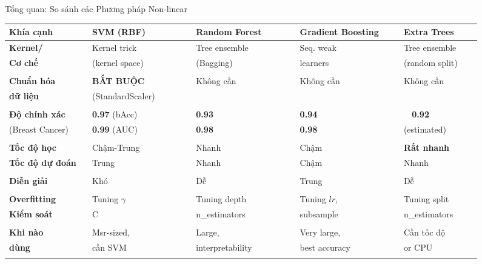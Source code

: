 \begin{frame}{Tổng quan: So sánh các Phương pháp Non-linear}
    \footnotesize
    \renewcommand{\arraystretch}{1.3}
    \begin{tabular}{p{0.16\linewidth} p{0.2\linewidth} p{0.2\linewidth} p{0.2\linewidth} p{0.15\linewidth}}
        \toprule
        \textbf{Khía cạnh} & \textbf{SVM (RBF)} & \textbf{Random Forest} & \textbf{Gradient Boosting} & \textbf{Extra Trees} \\
        \midrule
        \textbf{Kernel/} & Kernel trick & Tree ensemble & Seq. weak & Tree ensemble \\
        \textbf{Cơ chế} & (kernel space) & (Bagging) & learners & (random split) \\
        &  &  &  &  \\
        
        \textbf{Chuẩn hóa} & \textbf{BẮT BUỘC} & Không cần & Không cần & Không cần \\
        \textbf{dữ liệu} & (StandardScaler) & &  &  \\
        &  &  &  &  \\
        
        \textbf{Độ chính xác} & \textbf{0.97} (bAcc) & \textbf{0.93} & \textbf{0.94} & \textbf{~ 0.92} \\
        (Breast Cancer) & \textbf{0.99} (AUC) & \textbf{0.98} & \textbf{0.98} & (estimated) \\
        &  &  &  &  \\
        
        \textbf{Tốc độ học} & Chậm-Trung & Nhanh & Chậm & \textbf{Rất nhanh} \\
        \textbf{Tốc độ dự đoán} & Trung & Nhanh & Chậm & Nhanh \\
        &  &  &  &  \\
        
        \textbf{Diễn giải} & Khó & Dễ & Trung & Dễ \\
        &  &  &  &  \\
        
        \textbf{Overfitting} & Tuning $\gamma$ & Tuning depth & Tuning $lr$, & Tuning split \\
        \textbf{Kiểm soát} & C & n\_estimators & subsample & n\_estimators \\
        &  &  &  &  \\
        
        \textbf{Khi nào} & Msr-sized, & Large, & Very large, & Cần tốc độ \\
        \textbf{dùng} & cần SVM & interpretability & best accuracy & or CPU \\
        &  &  &  &  \\
        \bottomrule
    \end{tabular}


\end{frame}
